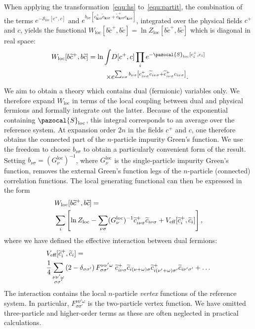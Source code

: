 \documentclass[rmp,aps,reprint,amsmath,amssymb,superscriptaddress,showpacs,nofootinbib]{revtex4-1}
\begin{document}
When applying the transformation~\eqref{equ:hs} to~\eqref{equ:partit}, the combination of the terms $e^{-\mathcal{S}_{\text{loc}}[c^+,c]}$ and $e^{b^{\phantom +}_{\nu\sigma}\left[c^+_{\mathbf{k}\nu\sigma}\widetilde{c}^{\phantom +}_{\mathbf{k}\nu\sigma}+\widetilde{c}^+_{\mathbf{k}\nu\sigma}c^{\phantom +}_{\mathbf{k}\nu\sigma}\right]}$, integrated over the physical fields $c^+$ and $c$, yields the functional $W_{\text{loc}}[b\widetilde{c}^+,b\widetilde{c}] = \ln Z_{\text{loc}}[b\widetilde{c}^+,b\widetilde{c}]$ which is  diagonal in real space:
\begin{align}
 \label{equ:defgenref}
 W_{\text{loc}}[b\widetilde{c}^+,b\widetilde{c}]=\ln\int &D[c^+,c]\prod_{i}e^{-\pazocal{S}_{\text{loc}}[c_{i}^+,c_{i}]}\nonumber\\ \times&e^{\sum_{\nu\sigma}b_{\nu\sigma}\left[c^+_{i\nu\sigma}\widetilde{c}_{i\nu\sigma}+\widetilde{c}_{i\nu\sigma}^+c_{i\nu\sigma}\right]}.
\end{align}
We aim to obtain a theory which contains dual (fermionic) variables only. We therefore expand $W_{\text{loc}}$ in terms of the local coupling between dual and physical fermions and formally integrate out the latter. Because of the exponential containing $\pazocal{S}_{\text{loc}}$, this integral corresponds to an average over the reference system. At expansion order $2n$ in the fields $c^+$ and $c$, one therefore obtains the connected part of the $n$-particle impurity Green's function. We use the freedom to choose $b_{\nu\sigma}$ to obtain a particularly convenient form of the result. Setting $b_{\nu\sigma}=(G^\text{loc}_\nu)^{-1}$, where $G^\text{loc}_\nu$ is the single-particle impurity Green's function, removes the external Green's function legs of the $n$-particle (connected) correlation functions. The local generating functional can then be expressed in the form
\begin{align}
\label{equ:genrefexpand}
  &W_{\text{loc}}[b\widetilde{c}^+,b\widetilde{c}]=\notag\\&\sum_i\left[\ln Z_{\text{loc}}-\sum_{\nu\sigma}(G^\text{loc}_\nu)^{-1}\widetilde{c}_{i\nu\sigma}^+\widetilde{c}_{i\nu\sigma}+V_{\text{eff}}[\widetilde{c}^+_i,\widetilde{c}_i]
  \right],
\end{align}
where we have defined the effective interaction between dual fermions:
 \begin{align}
\label{equ:vdef}  
  & V_{\text{eff}}[\widetilde{c}^+_i,\widetilde{c}_i]=\notag\\&
  \frac{1}{4}\sum_{\substack{\nu\nu'\omega \\ \sigma\sigma'}}\left(2-\delta_{\sigma\sigma'}\right)F_{\sigma\sigma'}^{\nu\nu'\omega}\;\widetilde{c}^+_{i\nu\sigma}\widetilde{c}_{i(\nu+\omega)\sigma}\widetilde{c}^+_{i(\nu'+\omega)\sigma'}\widetilde{c}_{i\nu'\sigma'}+\ldots
\end{align}
The interaction contains the local $n$-particle {\sl vertex} functions of the reference system. In particular, $F_{\sigma\sigma'}^{\nu\nu'\omega}$ is the two-particle vertex function. We have omitted three-particle and higher-order terms as these are often neglected in practical calculations. 
\end{document}
